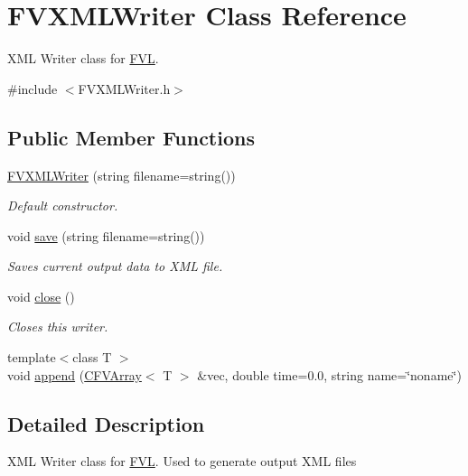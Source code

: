 \hypertarget{classFVL_1_1FVXMLWriter}{
\section{FVXMLWriter Class Reference}
\label{dc/d55/classFVL_1_1FVXMLWriter}
}


XML Writer class for \hyperlink{namespaceFVL}{FVL}.  




{\ttfamily \#include $<$FVXMLWriter.h$>$}

\subsection*{Public Member Functions}
\begin{DoxyCompactItemize}
\item 
\hyperlink{classFVL_1_1FVXMLWriter_a7fa5994d28e4d21f500f23c25c86c2e6}{FVXMLWriter} (string filename=string())
\begin{DoxyCompactList}\small\item\em Default constructor. \item\end{DoxyCompactList}\item 
void \hyperlink{classFVL_1_1FVXMLWriter_a2d5b6b4d4b7efc37728429a7c88cd46f}{save} (string filename=string())
\begin{DoxyCompactList}\small\item\em Saves current output data to XML file. \item\end{DoxyCompactList}\item 
void \hyperlink{classFVL_1_1FVXMLWriter_a5ae591df94fc66ccb85cbb6565368bca}{close} ()
\begin{DoxyCompactList}\small\item\em Closes this writer. \item\end{DoxyCompactList}\item 
{\footnotesize template$<$class T $>$ }\\void \hyperlink{classFVL_1_1FVXMLWriter_a2b15df402a7d0b3a050436cf98f192dd}{append} (\hyperlink{classFVL_1_1CFVArray}{CFVArray}$<$ T $>$ \&vec, double time=0.0, string name=\char`\"{}noname\char`\"{})
\end{DoxyCompactItemize}


\subsection{Detailed Description}
XML Writer class for \hyperlink{namespaceFVL}{FVL}. Used to generate output XML files 

